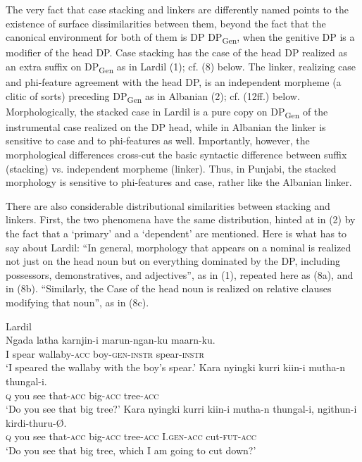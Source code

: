 \documentclass[output=paper]{langsci/langscibook}
\begin{document}
The very fact that case stacking and linkers are differently named points to the existence of surface dissimilarities between them, beyond the fact that the canonical environment for both of them is DP DP\textsubscript{Gen}, when the genitive DP is a modifier of the head DP. Case stacking has the case of the head DP realized as an extra suffix on DP\textsubscript{Gen} as in Lardil (1); cf. (8) below. The linker, realizing case and phi-feature agreement with the head DP, is an independent morpheme (a clitic of sorts) preceding DP\textsubscript{Gen} as in Albanian (2); cf. (12ff.) below. Morphologically, the stacked case in Lardil is a pure copy on DP\textsubscript{Gen} of the instrumental case realized on the DP head, while in Albanian the linker is sensitive to case and to phi-features as well. Importantly, however, the morphological differences cross-cut the basic syntactic difference between suffix (stacking) vs. independent morpheme (linker). Thus, in Punjabi, the stacked morphology is sensitive to phi-features and case, rather like the Albanian linker.  

  There are also considerable distributional similarities between stacking and linkers. First, the two phenomena have the same distribution, hinted at in (2) by the fact that a ‘primary’ and a ‘dependent’ are mentioned. Here is what \citet[46--47]{Richards2013} has to say about Lardil: “In general, morphology that appears on a nominal is realized not just on the head noun but on everything dominated by the DP, including possessors, demonstratives, and adjectives”, as in (1), repeated here as (8a), and in (8b). “Similarly, the Case of the head noun is realized on relative clauses modifying that noun”, as in (8c).  

\ea%
    Lardil  \citep[47]{Richards2013}\label{ex:manzini:8}\\
    \ea
    \gll Ngada latha   karnjin-i   marun-ngan-ku   maarn-ku.     \\
         I   spear   wallaby-\textsc{acc} boy-\textsc{gen-instr}  spear-\textsc{instr} \\
    \glt ‘I speared the wallaby with the boy’s spear.’
    \ex
    \gll Kara   nyingki   kurri   kiin-i     mutha-n   thungal-i. \\
         \textsc{q}    you     see   that-\textsc{acc}    big-\textsc{acc}    tree\textsc{{}-acc} \\
    \glt ‘Do you see that big tree?’
    \ex
    \gll Kara   nyingki kurri kiin-i     mutha-n thungal-i,   ngithun-i kirdi-thuru-Ø. \\
         \textsc{q}  you     see   that-\textsc{acc}    big-\textsc{acc}   tree-\textsc{acc}    I.\textsc{gen-acc}  cut-\textsc{fut-acc} \\
    \glt ‘Do you see that big tree, which I am going to cut down?’
    \z
\z
\end{document}
